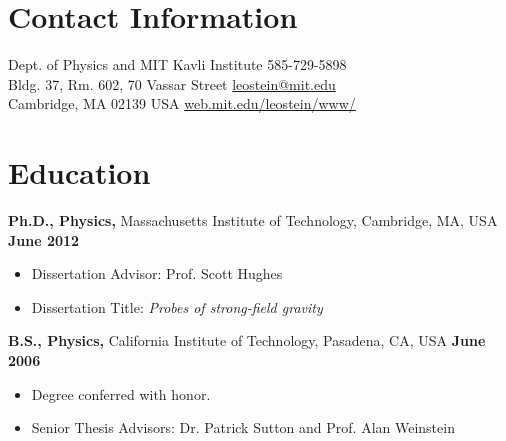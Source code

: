 \documentclass[margin,line]{res}
\begin{document}
\newcommand{\myname}{Leo C. Stein}
\newlength{\mynamewidth}
\settowidth{\mynamewidth}{\namefont\myname}

\name{\hspace*{0.5\textwidth}\hspace{-0.5\mynamewidth} \myname \vspace*{.1in}}

\begin{resume}
\section{\sc Contact Information}
\vspace{.05in}
Dept. of Physics and MIT Kavli Institute            \hfill 585-729-5898 \\
Bldg. 37, Rm. 602, 70 Vassar Street    \hfill \href{mailto:leostein@mit.edu}{leostein@mit.edu}\\
Cambridge, MA 02139 USA \hfill \href{http://web.mit.edu/leostein/www/}{web.mit.edu/leostein/www/}\\




\section{\sc Education}
{\bf Ph.D., Physics,} Massachusetts Institute of Technology, Cambridge, MA, USA \hfill {\bf June 2012}\\
\vspace*{-.1in}
\begin{itemize}
\item[ ] Dissertation Advisor: Prof. Scott Hughes
\item[ ] Dissertation Title: {\it Probes of strong-field gravity}
\end{itemize}

{\bf B.S., Physics,} California Institute of
Technology, Pasadena, CA, USA \hfill {\bf June 2006}\\
\vspace*{-.1in}
\begin{itemize}
\item[ ] Degree conferred with honor.
\item[ ] Senior Thesis Advisors: Dr. Patrick Sutton and Prof. Alan Weinstein
\end{itemize}


\end{resume}
\end{document}
